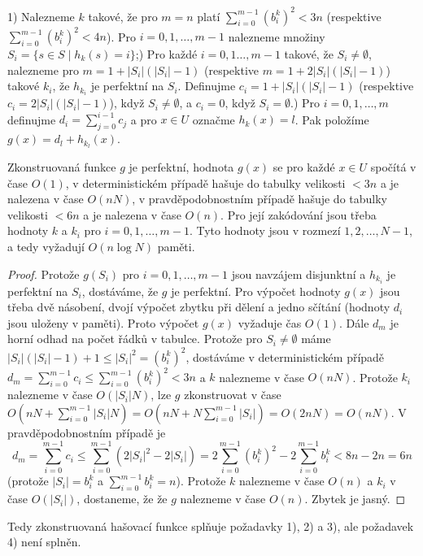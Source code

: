 \documentclass[a4paper,12pt]{article}
\begin{document}
1) Nalezneme $k$ takové, že pro $m=n$ platí 
$\sum_{i=0}^{m-1}(b_i^k)^2<3n$ (respektive $\sum_{i=0}^{m-1}(b_i^
k)^2<4n$).  Pro 
$i=0,1,\dots,m-1$ nalezneme množiny 
$S_i=\{s\in S\mid h_k(s)=i\}$;) Pro každé $i=0,1\dots,m-1$ takové, že $S_i\ne\emptyset$, 
nalezneme pro $m=1+|S_i|(|S_i|-1)$ (respektive $m=1+2|S_i|(|S_i|-
1)$) 
takové $k_i$, že $h_{k_i}$ je perfektní na $S_i$. Definujme 
$c_i=1+|S_i|(|S_i|-1)$ (respektive $c_i=2|S_i|(|S_i|-1)$), když 
$S_i\ne\emptyset$, a $c_i=0$, když 
$S_i=\emptyset$.) Pro $i=0,1,\dots,m$ definujme $d_i=\sum_{j=0}^{i-1}c_j$ a pro $
x\in U$ 
označme $h_k(x)=l$. Pak položíme $g(x)=d_l+h_{k_l}(x)$.

\begin{veta}Zkonstruovaná funkce $g$ je perfektní, 
hodnota $g(x)$ se pro každé $x\in U$ spočítá v čase $
O(1)$, 
v deterministickém přípa\-dě hašuje do tabulky velikosti 
$<3n$ a je nalezena v čase $O(nN)$, v pravděpodobnostním 
přípa\-dě hašuje do tabulky velikosti $<6n$ a je nalezena 
v čase $O(n)$. Pro její zakódování jsou třeba hodnoty $
k$ a 
$k_i$ pro $i=0,1,\dots,m-1$. Tyto hodnoty jsou v rozmezí 
$1,2,\dots,N-1$, a tedy vyžadují $O(n\log N)$ paměti.
\end{veta}

\begin{proof}Protože $g(S_i)$ pro $i=0,1,\dots,m-1$ 
jsou navzájem disjunktní a $h_{k_i}$ je perfektní na $S_
i$, 
dostáváme, že $g$ je perfektní. Pro výpočet hodnoty $
g(x)$ 
jsou třeba dvě násobení, dvojí výpočet zbytku při 
dělení a jedno sčítání (hodnoty $d_i$ jsou uloženy v 
paměti). Proto výpočet $g(x)$ vyžaduje čas $O(1)$. Dále 
$d_m$ je horní odhad na počet řádků v tabulce. 
Protože pro $S_i\ne\emptyset$ máme $|S_i|(|S_i|-1)+1\le |S_
i|^2=(b_i^k)^2$, 
dostáváme v deterministickém případě 
$d_m=\sum_{i=0}^{m-1}c_i\le\sum_{i=0}^{m-1}(b_i^k)^2<3n$ a $k$ nalezneme v čase 
$O(nN)$. Protože $k_i$ nalezneme v čase $O(|S_i|N)$, lze $g$ 
zkonstruovat v čase 
$O(nN+\sum_{i=0}^{m-1}|S_i|N)=O(nN+N\sum_{i=0}^{m-1}|S_i|)=O(2nN)
=O(nN)$. 
V pravděpodob\-nostním případě je 
$$d_m=\sum_{i=0}^{m-1}c_i\le\sum_{i=0}^{m-1}(2|S_i|^2-2|S_i|)=2\sum_{
i=0}^{m-1}(b_i^k)^2-2\sum_{i=0}^{m-1}b_i^k<8n-2n=6n$$
(protože $|S_i|=b_i^k$ a $\sum_{i=0}^{m-1}b_i^k=n$). Protože $
k$ nalezneme v čase $O(n)$ a $k_i$ v čase $O(|S_i|)$, dostaneme, že 
že $g$ nalezneme v čase $O(n)$. Zbytek je jasný.
\end{proof}

Tedy zkonstruovaná hašovací funkce splňuje požadavky 
1), 2) a 3), ale požadavek 4) není splněn. 
\end{document}
